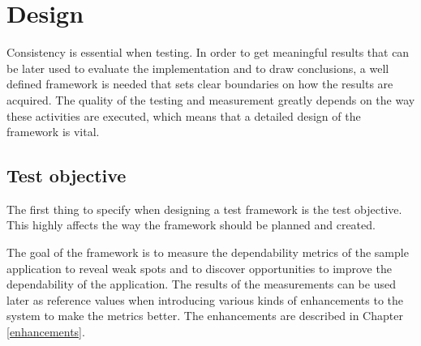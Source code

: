 \section{Design} \label{test-framework-design}

Consistency is essential when testing. In order to get meaningful results that can be later used to evaluate the implementation and to draw conclusions, a well defined framework is needed that sets clear boundaries on how the results are acquired. The quality of the testing and measurement greatly depends on the way these activities are executed, which means that a detailed design of the framework is vital.

%	

\subsection{Test objective} \label{test-design-objective}

The first thing to specify when designing a test framework is the test objective. This highly affects the way the framework should be planned and created.

The goal of the framework is to measure the dependability metrics of the sample application to reveal weak spots and to discover opportunities to improve the dependability of the application. The results of the measurements can be used later as reference values when introducing various kinds of enhancements to the system to make the metrics better. The enhancements are described in Chapter \ref{enhancements}.


